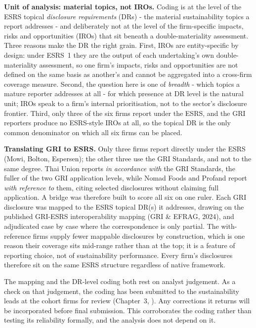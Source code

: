 \textbf{Unit of analysis: material topics, not IROs.} Coding is at the level of
the ESRS topical \emph{disclosure requirements} (DRs) - the material
sustainability topics a report addresses - and deliberately not at the level of
the firm-specific impacts, risks and opportunities (IROs) that sit beneath a
double-materiality assessment. Three reasons make the DR the right grain. First,
IROs are entity-specific by design: under ESRS~1 they are the output of each
undertaking's own double-materiality assessment, so one firm's impacts, risks and
opportunities are not defined on the same basis as another's and cannot be
aggregated into a cross-firm coverage measure. Second, the question here is one of
\emph{breadth} - which topics a mature reporter addresses at all - for which
presence at DR level is the natural unit; IROs speak to a firm's internal
prioritisation, not to the sector's disclosure frontier. Third, only three of the
six firms report under the ESRS, and the GRI reporters produce no ESRS-style IROs
at all, so the topical DR is the only common denominator on which all six firms
can be placed.

\textbf{Translating GRI to ESRS.} Only three firms report directly under the ESRS
(Mowi, Bolton, Espersen); the other three use the GRI Standards, and not to the
same degree. Thai Union reports \emph{in accordance with} the GRI Standards,
the fuller of the two GRI application levels, while Nomad Foods and Profand
report \emph{with reference to} them, citing selected disclosures without
claiming full application. A bridge was therefore built to score all six on one
ruler. Each GRI disclosure was mapped to the ESRS topical DR(s) it addresses,
drawing on the published GRI-ESRS interoperability mapping (GRI \& EFRAG, 2024),
and adjudicated case by case where the correspondence is only partial. The
with-reference firms supply fewer mappable disclosures by construction, which is
one reason their coverage sits mid-range rather than at the top; it is a feature
of reporting choice, not of sustainability performance. Every firm's disclosures
therefore sit on the same ESRS structure regardless of native framework.

The mapping and the DR-level coding both rest on analyst judgement. As a check on
that judgement, the coding has been submitted to the sustainability leads at the
cohort firms for review (Chapter~3, ). Any
corrections it returns will be incorporated before final submission. This
corroborates the coding rather than testing its reliability formally, and the
analysis does not depend on it.

